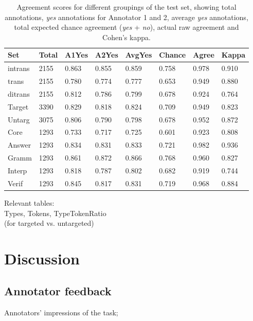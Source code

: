 \documentclass[11pt,a4paper]{article}
\begin{document}
\begin{table}[t!]
\begin{center}
\begin{tabular}{|l|l|l|l|l|l|l|l|}
\hline
Set	& Total	& A1Yes & A2Yes & AvgYes & Chance & Agree & Kappa \\
\hline
\hline
intrans & 2155 & 0.863 & 0.855 & 0.859 & 0.758 & 0.978 & 0.910 \\
\hline
trans & 2155 & 0.780 & 0.774 & 0.777 & 0.653 & 0.949 & 0.880 \\
\hline
ditrans & 2155 & 0.812 & 0.786 & 0.799 & 0.678 & 0.924 & 0.764 \\ 
\hline
\hline
Target & 3390 & 0.829 & 0.818 & 0.824 & 0.709 & 0.949 & 0.823 \\
\hline
Untarg & 3075 & 0.806 & 0.790 & 0.798 & 0.678 & 0.952 & 0.872 \\
\hline
\hline
Core & 1293 & 0.733 & 0.717 & 0.725 & 0.601 & 0.923 & 0.808 \\
\hline
Answer & 1293 & 0.834 & 0.831 & 0.833 & 0.721 & 0.982 & 0.936 \\
\hline
Gramm & 1293 & 0.861 & 0.872 & 0.866 & 0.768 & 0.960 & 0.827 \\
\hline
Interp & 1293 & 0.818 & 0.787 & 0.802 & 0.682 & 0.919 & 0.744 \\
\hline
Verif & 1293 & 0.845 & 0.817 & 0.831 & 0.719 & 0.968 & 0.884 \\
\hline
\end{tabular}
\caption{\label{tab:agreement} Agreement scores for different groupings of the test set, showing total annotations, \textit{yes} annotations for Annotator 1 and 2, average \textit{yes} annotations, total expected chance agreement (\textit{yes} + \textit{no}), actual raw agreement and Cohen's kappa.}
\end{center}
\end{table}

\smallskip

Relevant tables:\\
Types, Tokens, TypeTokenRatio \\
(for targeted vs. untargeted) \\

\section{Discussion}

\subsection{Annotator feedback}
Annotators' impressions of the task; 
\end{document}
